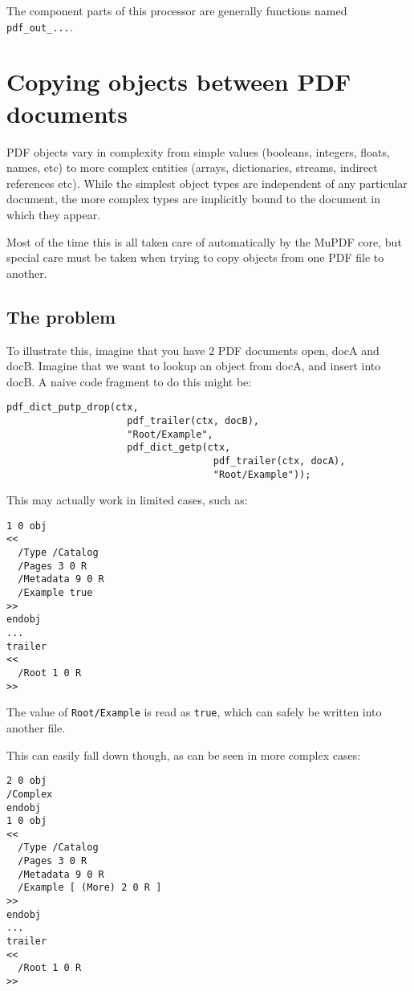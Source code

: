 \documentclass[oneside]{book}
\begin{document}
The component parts of this processor are generally functions named \texttt{pdf\_out\_...}.

\section{Copying objects between PDF documents}

PDF objects vary in complexity from simple values (booleans, integers, floats, names, etc) to more complex entities (arrays, dictionaries, streams, indirect references etc). While the simplest object types are independent of any particular document, the more complex types are implicitly bound to the document in which they appear.

Most of the time this is all taken care of automatically by the MuPDF core, but special care must be taken when trying to copy objects from one PDF file to another.

\subsection{The problem}

To illustrate this, imagine that you have 2 PDF documents open, docA and docB. Imagine that we want to lookup an object from docA, and insert into docB. A naive code fragment to do this might be:

\begin{lstlisting}
pdf_dict_putp_drop(ctx,
                     pdf_trailer(ctx, docB),
                     "Root/Example",
                     pdf_dict_getp(ctx,
                                    pdf_trailer(ctx, docA),
                                    "Root/Example"));
\end{lstlisting}

This may actually work in limited cases, such as:

\begin{lstlisting}
1 0 obj
<<
  /Type /Catalog
  /Pages 3 0 R
  /Metadata 9 0 R
  /Example true
>>
endobj
...
trailer
<<
  /Root 1 0 R
>>
\end{lstlisting}

The value of \texttt{Root/Example} is read as \texttt{true}, which can safely be written into another file.

This can easily fall down though, as can be seen in more complex cases:

\begin{lstlisting}
2 0 obj
/Complex
endobj
1 0 obj
<<
  /Type /Catalog
  /Pages 3 0 R
  /Metadata 9 0 R
  /Example [ (More) 2 0 R ]
>>
endobj
...
trailer
<<
  /Root 1 0 R
>>
\end{lstlisting}
\end{document}
